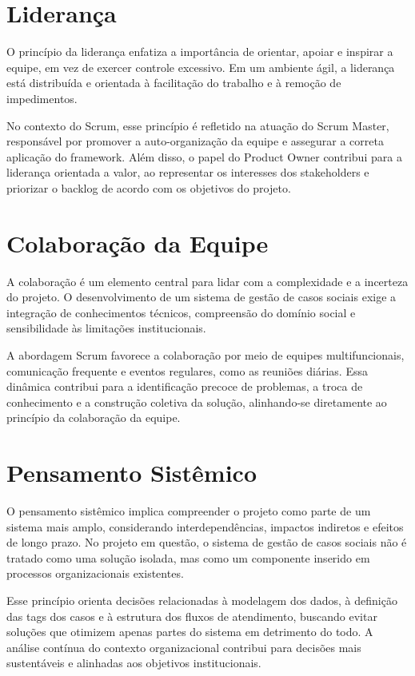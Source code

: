 \section{Liderança}

O princípio da liderança enfatiza a importância de orientar, apoiar e inspirar a equipe, em vez de exercer controle excessivo. Em um ambiente ágil, a liderança está distribuída e orientada à facilitação do trabalho e à remoção de impedimentos.

No contexto do Scrum, esse princípio é refletido na atuação do Scrum Master, responsável por promover a auto-organização da equipe e assegurar a correta aplicação do framework. Além disso, o papel do Product Owner contribui para a liderança orientada a valor, ao representar os interesses dos stakeholders e priorizar o backlog de acordo com os objetivos do projeto.

\section{Colaboração da Equipe}

A colaboração é um elemento central para lidar com a complexidade e a incerteza do projeto. O desenvolvimento de um sistema de gestão de casos sociais exige a integração de conhecimentos técnicos, compreensão do domínio social e sensibilidade às limitações institucionais.

A abordagem Scrum favorece a colaboração por meio de equipes multifuncionais, comunicação frequente e eventos regulares, como as reuniões diárias. Essa dinâmica contribui para a identificação precoce de problemas, a troca de conhecimento e a construção coletiva da solução, alinhando-se diretamente ao princípio da colaboração da equipe.

\section{Pensamento Sistêmico}

O pensamento sistêmico implica compreender o projeto como parte de um sistema mais amplo, considerando interdependências, impactos indiretos e efeitos de longo prazo. No projeto em questão, o sistema de gestão de casos sociais não é tratado como uma solução isolada, mas como um componente inserido em processos organizacionais existentes.

Esse princípio orienta decisões relacionadas à modelagem dos dados, à definição das tags dos casos e à estrutura dos fluxos de atendimento, buscando evitar soluções que otimizem apenas partes do sistema em detrimento do todo. A análise contínua do contexto organizacional contribui para decisões mais sustentáveis e alinhadas aos objetivos institucionais.


